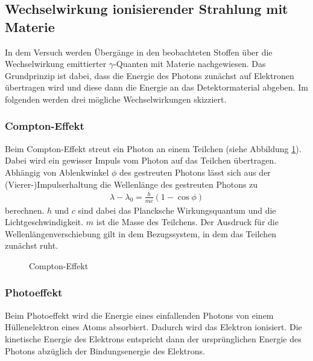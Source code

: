 \subsection{Wechselwirkung ionisierender Strahlung mit Materie}
In dem Versuch werden Übergänge in den beobachteten Stoffen über die Wechselwirkung emittierter $\gamma$-Quanten mit Materie nachgewiesen. Das Grundprinzip ist dabei, dass die Energie des Photons zunächst auf Elektronen übertragen wird und diese dann die Energie an das Detektormaterial abgeben. Im folgenden werden drei mögliche Wechselwirkungen skizziert.
\subsubsection{Compton-Effekt} 
Beim Compton-Effekt streut ein Photon an einem Teilchen (siehe Abbildung \ref{fig:compton}). Dabei wird ein gewisser Impuls vom Photon auf das Teilchen übertragen. Abhängig von Ablenkwinkel $\phi$ des gestreuten Photons lässt sich aus der (Vierer-)Impulserhaltung die Wellenlänge des gestreuten Photons zu
\begin{align}
  \lambda-\lambda_0=\frac{h}{mc}(1-\cos \phi)
  \label{eq:compton}
\end{align} 
berechnen. $h$ und $c$ sind dabei das Plancksche Wirkungsquantum und die Lichtgeschwindigkeit. $m$ ist die Masse des Teilchens. Der Ausdruck für die Wellenlängenverschiebung gilt in dem Bezugssystem, in dem das Teilchen zunächst ruht.
\begin{figure}[h]
  \centering
  \caption{Compton-Effekt}
  \label{fig:compton}
\end{figure}

\subsubsection{Photoeffekt}
Beim Photoeffekt wird die Energie eines einfallenden Photons von einem Hüllenelektron eines Atoms absorbiert. Dadurch wird das Elektron ionisiert. Die kinetische Energie des Elektrons entspricht dann der ursprünglichen Energie des Photons abzüglich der Bindungsenergie des Elektrons.

